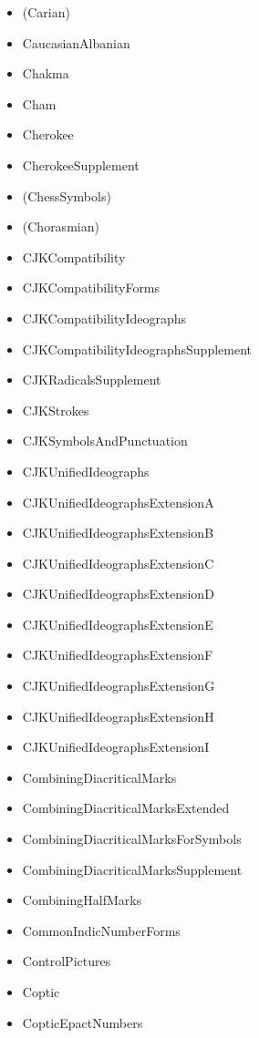 \documentclass{article}
\newenvironment{itemlist}{%
  \begin{itemize}
  \setlength{\itemsep}{0pt}
  \setlength{\parsep}{0pt}
  \setlength{\topsep}{0pt}
  \setlength{\partopsep}{0pt}
  \setlength{\parskip}{0pt}
  \setlength{\labelsep}{5pt}}%
{
  \end{itemize}}
\begin{document}
\begin{multicols*}{2}
\begin{itemlist}
        \item (Carian)
        \item CaucasianAlbanian
        \item Chakma
        \item Cham
        \item Cherokee
        \item CherokeeSupplement
        \item (ChessSymbols)
        \item (Chorasmian)
        \item CJKCompatibility
        \item CJKCompatibilityForms
        \item CJKCompatibilityIdeographs
        \item CJKCompatibilityIdeographsSupplement
        \item CJKRadicalsSupplement
        \item CJKStrokes
        \item CJKSymbolsAndPunctuation
        \item CJKUnifiedIdeographs
        \item CJKUnifiedIdeographsExtensionA
        \item CJKUnifiedIdeographsExtensionB
        \item CJKUnifiedIdeographsExtensionC
        \item CJKUnifiedIdeographsExtensionD
        \item CJKUnifiedIdeographsExtensionE
        \item CJKUnifiedIdeographsExtensionF
        \item CJKUnifiedIdeographsExtensionG
        \item CJKUnifiedIdeographsExtensionH
        \item CJKUnifiedIdeographsExtensionI
        \item CombiningDiacriticalMarks
        \item CombiningDiacriticalMarksExtended
        \item CombiningDiacriticalMarksForSymbols
        \item CombiningDiacriticalMarksSupplement
        \item CombiningHalfMarks
        \item CommonIndicNumberForms
        \item ControlPictures
        \item Coptic
        \item CopticEpactNumbers

\end{itemlist}
\end{multicols*}
\end{document}
